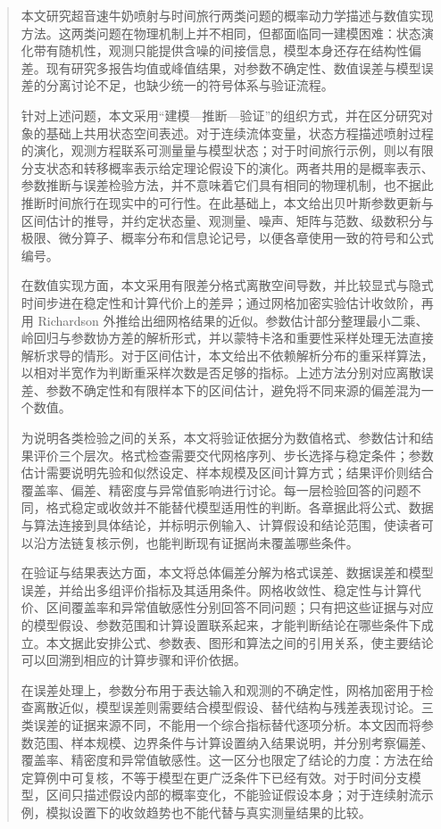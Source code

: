 \begin{abstract}

本文研究超音速牛奶喷射与时间旅行两类问题的概率动力学描述与数值实现方法。这两类问题在物理机制上并不相同，但都面临同一建模困难：状态演化带有随机性，观测只能提供含噪的间接信息，模型本身还存在结构性偏差。现有研究多报告均值或峰值结果，对参数不确定性、数值误差与模型误差的分离讨论不足，也缺少统一的符号体系与验证流程。

针对上述问题，本文采用“建模—推断—验证”的组织方式，并在区分研究对象的基础上共用状态空间表述。对于连续流体变量，状态方程描述喷射过程的演化，观测方程联系可测量量与模型状态；对于时间旅行示例，则以有限分支状态和转移概率表示给定理论假设下的演化。两者共用的是概率表示、参数推断与误差检验方法，并不意味着它们具有相同的物理机制，也不据此推断时间旅行在现实中的可行性。在此基础上，本文给出贝叶斯参数更新与区间估计的推导，并约定状态量、观测量、噪声、矩阵与范数、级数积分与极限、微分算子、概率分布和信息论记号，以便各章使用一致的符号和公式编号。

在数值实现方面，本文采用有限差分格式离散空间导数，并比较显式与隐式时间步进在稳定性和计算代价上的差异；通过网格加密实验估计收敛阶，再用 Richardson 外推给出细网格结果的近似。参数估计部分整理最小二乘、岭回归与参数协方差的解析形式，并以蒙特卡洛和重要性采样处理无法直接解析求导的情形。对于区间估计，本文给出不依赖解析分布的重采样算法，以相对半宽作为判断重采样次数是否足够的指标。上述方法分别对应离散误差、参数不确定性和有限样本下的区间估计，避免将不同来源的偏差混为一个数值。

为说明各类检验之间的关系，本文将验证依据分为数值格式、参数估计和结果评价三个层次。格式检查需要交代网格序列、步长选择与稳定条件；参数估计需要说明先验和似然设定、样本规模及区间计算方式；结果评价则结合覆盖率、偏差、精密度与异常值影响进行讨论。每一层检验回答的问题不同，格式稳定或收敛并不能替代模型适用性的判断。各章据此将公式、数据与算法连接到具体结论，并标明示例输入、计算假设和结论范围，使读者可以沿方法链复核示例，也能判断现有证据尚未覆盖哪些条件。

在验证与结果表达方面，本文将总体偏差分解为格式误差、数据误差和模型误差，并给出多组评价指标及其适用条件。网格收敛性、稳定性与计算代价、区间覆盖率和异常值敏感性分别回答不同问题；只有把这些证据与对应的模型假设、参数范围和计算设置联系起来，才能判断结论在哪些条件下成立。本文据此安排公式、参数表、图形和算法之间的引用关系，使主要结论可以回溯到相应的计算步骤和评价依据。

在误差处理上，参数分布用于表达输入和观测的不确定性，网格加密用于检查离散近似，模型误差则需要结合模型假设、替代结构与残差表现讨论。三类误差的证据来源不同，不能用一个综合指标替代逐项分析。本文因而将参数范围、样本规模、边界条件与计算设置纳入结果说明，并分别考察偏差、覆盖率、精密度和异常值敏感性。这一区分也限定了结论的力度：方法在给定算例中可复核，不等于模型在更广泛条件下已经有效。对于时间分支模型，区间只描述假设内部的概率变化，不能验证假设本身；对于连续射流示例，模拟设置下的收敛趋势也不能代替与真实测量结果的比较。


\end{abstract}
